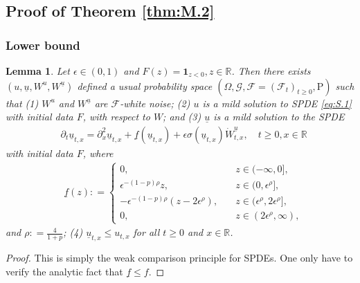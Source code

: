 \documentclass[12pt,a4paper]{amsart}
\numberwithin{equation}{section}
\theoremstyle{plain}
\newtheorem{lemma}[theorem]{Lemma}
\theoremstyle{remark}
\begin{document}
\subsection{Proof of Theorem \ref{thm:M.2}} \label{sec:S}
\subsubsection{Lower bound}
\begin{lemma}\label{thm:S.1}
	Let $\epsilon\in (0,1)$ and $F(z) = \mathbf 1_{z< 0},z\in \mathbb R$.
	Then there exists $(u,\underline u, W^u, W^{\underline u} )$ defined a usual probability space $(\Omega, \mathcal G,\mathcal F = (\mathcal F_t)_{t\geq 0}, \mathrm P)$ such that 
	(1) $W^u$ and $W^{\underline u}$ are $\mathcal F$-white noise; 
	(2) $u$ is a mild solution to SPDE \eqref{eq:S.1} with initial data $F$, with respect to $W$; and 
	(3) $\underline u$ is a mild solution to the SPDE 
\begin{align} 
&  \partial_t \underline u_{t,x} = \partial_x^2 \underline u_{t,x} + \underline f(\underline u_{t,x}) + \epsilon \sigma(\underline u_{t,x}) \dot W^{\underline u}_{t,x}, \quad t\geq 0, x\in \mathbb R
\end{align}
	with initial data $F$, where 
\begin{align} 
& \underline f(z): = \begin{cases}
0, & \quad z\in (-\infty, 0],
\\\epsilon^{-(1-p)\rho} z, & \quad z \in (0,\epsilon^\rho],
\\- \epsilon^{-(1-p)\rho}(z - 2\epsilon^\rho), &\quad z\in (\epsilon^\rho, 2\epsilon^\rho],
\\ 0 , & \quad z\in (2\epsilon^\rho, \infty),
\end{cases} 
\end{align}
 and $\rho : = \frac{4}{1+p}$; 
 (4) $\underline u_{t,x} \leq u_{t,x}$ for all $t\geq 0$ and $x\in \mathbb R$.
 \end{lemma}

\begin{proof}
	\color{blue}
	This is simply the weak comparison principle for SPDEs. One only have to verify the analytic fact that  $\underline f\leq f$.
\end{proof}
 
\end{document}
